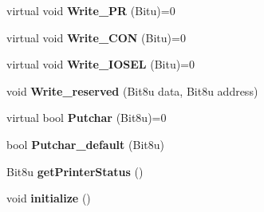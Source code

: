 \begin{DoxyCompactItemize}
\item 
\hypertarget{classCParallel_a4ae135be13ad44222c0cd789aa7effd7}{virtual void {\bfseries Write\-\_\-\-P\-R} (Bitu)=0}\label{classCParallel_a4ae135be13ad44222c0cd789aa7effd7}

\item 
\hypertarget{classCParallel_ac0825059ea487383352a4a2194bfe509}{virtual void {\bfseries Write\-\_\-\-C\-O\-N} (Bitu)=0}\label{classCParallel_ac0825059ea487383352a4a2194bfe509}

\item 
\hypertarget{classCParallel_a9cb37e39c63d01ca3eb7b79dbfa67687}{virtual void {\bfseries Write\-\_\-\-I\-O\-S\-E\-L} (Bitu)=0}\label{classCParallel_a9cb37e39c63d01ca3eb7b79dbfa67687}

\item 
\hypertarget{classCParallel_a83a2180dc69d0c253ee9a5a2ef540a39}{void {\bfseries Write\-\_\-reserved} (Bit8u data, Bit8u address)}\label{classCParallel_a83a2180dc69d0c253ee9a5a2ef540a39}

\item 
\hypertarget{classCParallel_a8a8020faba1f51c4226185334a2a83e4}{virtual bool {\bfseries Putchar} (Bit8u)=0}\label{classCParallel_a8a8020faba1f51c4226185334a2a83e4}

\item 
\hypertarget{classCParallel_ad78fe2e8e54a76043d05e55ddf041457}{bool {\bfseries Putchar\-\_\-default} (Bit8u)}\label{classCParallel_ad78fe2e8e54a76043d05e55ddf041457}

\item 
\hypertarget{classCParallel_ac03346b2c112fe9db67acf2250023532}{Bit8u {\bfseries get\-Printer\-Status} ()}\label{classCParallel_ac03346b2c112fe9db67acf2250023532}

\item 
\hypertarget{classCParallel_a4de0462d0fcc42ac21570685b36c1138}{void {\bfseries initialize} ()}\label{classCParallel_a4de0462d0fcc42ac21570685b36c1138}

\end{DoxyCompactItemize}
